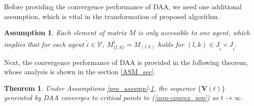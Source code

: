 \documentclass[journal]{IEEEtran}
\newtheorem{theorem}{Theorem}[section]
\newtheorem{remark}{Remark}[section]
\newtheorem{assumption}{Assumption}[section]
\begin{document}
\par Before providing the convergence performance of DAA, we need one additional assumption, which is vital in the transformation of proposed algorithm.
\begin{assumption}\label{asyn_assump}
	Each element of matrix $M$ is only accessible to one agent, which implies that for each agent $\tilde{i}\in \mathcal{V}$, $M^{\tilde{i}}_{\{l,k\}}=M_{(l,k)}$ holds for $(l,k)\in J_{\tilde{i}}\times J_{\tilde{i}}$.
\end{assumption}
\par Next, the convergence performance of DAA is provided in the following theorem, whose analysis is shown in the section \ref{ASM_sec}.
\begin{theorem}\label{asyn_theo}
	Under Assumptions \ref{pro_assump}-\ref{asyn_assump}, the sequence $\{\mathbf V(t)\}$ generated by DAA converges to critical points to (\ref{non-convex_pro}) as $t\rightarrow\infty$. 
\end{theorem}
\end{document}
